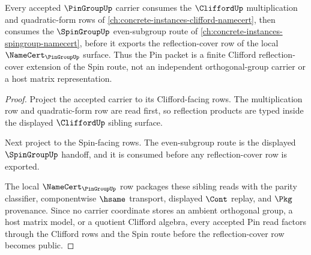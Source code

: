 \begin{theorem}
\label{thm:pin-group-clifford-sibling-route}
Every accepted $\PinGroupUp$ carrier consumes the $\CliffordUp$ multiplication and quadratic-form rows of \autoref{ch:concrete-instances-clifford-namecert}, then consumes the $\SpinGroupUp$ even-subgroup route of \autoref{ch:concrete-instances-spingroup-namecert}, before it exports the reflection-cover row of the local $\NameCert_{\PinGroupUp}$ surface. Thus the Pin packet is a finite Clifford reflection-cover extension of the Spin route, not an independent orthogonal-group carrier or a host matrix representation.
\end{theorem}

\begin{proof}
Project the accepted carrier to its Clifford-facing rows. The multiplication row and quadratic-form row are read first, so reflection products are typed inside the displayed $\CliffordUp$ sibling surface.

Next project to the Spin-facing rows. The even-subgroup route is the displayed $\SpinGroupUp$ handoff, and it is consumed before any reflection-cover row is exported.

The local $\NameCert_{\PinGroupUp}$ row packages these sibling reads with the parity classifier, componentwise $\hsame$ transport, displayed $\Cont$ replay, and $\Pkg$ provenance. Since no carrier coordinate stores an ambient orthogonal group, a host matrix model, or a quotient Clifford algebra, every accepted Pin read factors through the Clifford rows and the Spin route before the reflection-cover row becomes public.
\end{proof}
